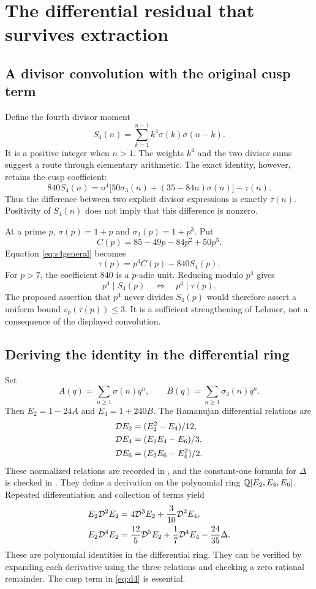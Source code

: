 \chapter{The differential residual that survives extraction}\label{ch:differential}
\section{A divisor convolution with the original cusp term}
Define the fourth divisor moment
\[
S_4(n)=\sum_{k=1}^{n-1}k^4\sigma(k)\sigma(n-k).
\]
It is a positive integer when $n>1$. The weights $k^4$ and the two divisor sums suggest a route through elementary arithmetic. The exact identity, however, retains the cusp coefficient:
\begin{equation}\label{eq:s4general}
840S_4(n)=n^4\bigl[50\sigma_3(n)+(35-84n)\sigma(n)\bigr]-\tau(n).
\end{equation}
Thus the difference between two explicit divisor expressions is exactly $\tau(n)$. Positivity of $S_4(n)$ does not imply that this difference is nonzero.

At a prime $p$, $\sigma(p)=1+p$ and $\sigma_3(p)=1+p^3$. Put
\[
C(p)=85-49p-84p^2+50p^3.
\]
Equation \eqref{eq:s4general} becomes
\begin{equation}\label{eq:s4prime}
\tau(p)=p^4C(p)-840S_4(p).
\end{equation}
For $p>7$, the coefficient $840$ is a $p$-adic unit. Reducing modulo $p^4$ gives
\begin{equation}\label{eq:p4equiv}
p^4\mid S_4(p)\quad\Longleftrightarrow\quad p^4\mid\tau(p).
\end{equation}
The proposed assertion that $p^4$ never divides $S_4(p)$ would therefore assert a uniform bound $v_p(\tau(p))\le3$. It is a sufficient strengthening of Lehmer, not a consequence of the displayed convolution.

\section{Deriving the identity in the differential ring}
Set
\[
A(q)=\sum_{n\ge1}\sigma(n)q^n,\qquad
B(q)=\sum_{n\ge1}\sigma_3(n)q^n.
\]
Then $E_2=1-24A$ and $E_4=1+240B$. The Ramanujan differential relations are
\begin{align}
\mathcal D E_2&=(E_2^2-E_4)/12,\\
\mathcal D E_4&=(E_2E_4-E_6)/3,\\
\mathcal D E_6&=(E_2E_6-E_4^2)/2.
\end{align}
These normalized relations are recorded in \cite{Fonseca}, and the constant-one formula for $\Delta$ is checked in \cite{Stein}. They define a derivation on the polynomial ring $\mathbb Q[E_2,E_4,E_6]$. Repeated differentiation and collection of terms yield
\begin{align}
E_2\mathcal D^2E_2&=4\mathcal D^3E_2+\frac3{10}\mathcal D^2E_4,\label{eq:d2}\\
E_2\mathcal D^4E_2&=\frac{12}{5}\mathcal D^5E_2+\frac17\mathcal D^4E_4-\frac{24}{35}\Delta.\label{eq:d4}
\end{align}
These are polynomial identities in the differential ring. They can be verified by expanding each derivative using the three relations and checking a zero rational remainder. The cusp term in \eqref{eq:d4} is essential.

